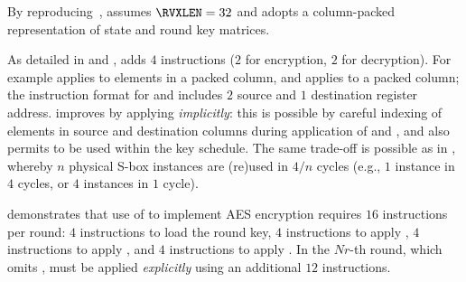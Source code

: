 
By reproducing~\cite[Section 4.3]{TilGro:06},
assumes 
$\RVXLEN = 32$
and adopts a 
column-packed 
representation of state and round key matrices.

As detailed in
and
,
adds
$ 4$
instructions ($2$ for encryption, $2$ for decryption).
For example
applies 
to elements in   a packed column,
and
applies 
to               a packed column;
the instruction format for
and
includes $2$ source and $1$ destination register address.
 improves  by applying  
{\em implicitly}:
this is possible by careful indexing of elements in source and destination
columns during application of  and ,
and also permits
to be used within the key schedule.
The same trade-off is possible as in , whereby
$n$ physical S-box instances are (re)used in $4/n$ cycles
(e.g., $1$ instance in $4$ cycles, or $4$ instances in $1$ cycle).

demonstrates that use of  to implement AES encryption requires
$16$ instructions per round:
$ 4$            
     instructions to load the round key,
$ 4$            
     instructions to apply ,
$ 4$   
     instructions to apply ,
     and
$ 4$   
     instructions to apply .
In the $Nr$-th round, which omits ,
 must be applied
{\em explicitly}
using an additional $12$ instructions.


